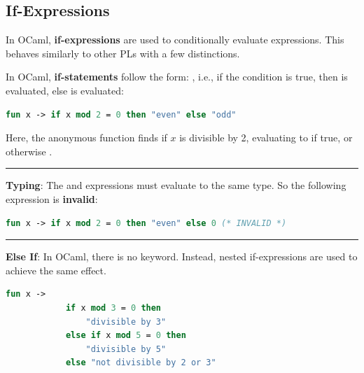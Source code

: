 \noindent

\newpage
\subsection{If-Expressions}
In OCaml, \textbf{if-expressions} are used to conditionally evaluate expressions. This behaves similarly to other PLs with a few distinctions.

\vspace{2em}
\begin{Def}

    In OCaml, \textbf{if-statements} follow the form: , i.e., 
    if the condition is true, then  is evaluated, else  is evaluated:
    \begin{lstlisting}[language=OCaml, caption={If-Expression: Divisible by 2}, numbers=none]
        fun x -> if x mod 2 = 0 then "even" else "odd"
    \end{lstlisting}

    \noindent
    Here, the anonymous function finds if $x$ is divisible by 2, evaluating to  if true, or otherwise .

    \noindent
    \rule{\textwidth}{0.4pt}

    \vspace{.3em}
    \noindent
    \textbf{Typing}: The  and  expressions must evaluate to the same type. 
    So the following expression is \textbf{invalid}:

    \begin{lstlisting}[language=OCaml, caption={Invalid If-Expression}, numbers=none]
        fun x -> if x mod 2 = 0 then "even" else 0 (* INVALID *)
    \end{lstlisting}

    \noindent
    \rule{\textwidth}{0.4pt}

    \vspace{.3em}
    \noindent
    \textbf{Else If}: In OCaml, there is no  keyword. Instead, nested if-expressions are used to achieve the same effect.

    \begin{lstlisting}[language=OCaml, caption={Else If Example}, numbers=none]
        fun x -> 
            if x mod 3 = 0 then 
                "divisible by 3"
            else if x mod 5 = 0 then
                "divisible by 5" 
            else "not divisible by 2 or 3"
    \end{lstlisting}
\end{Def}



